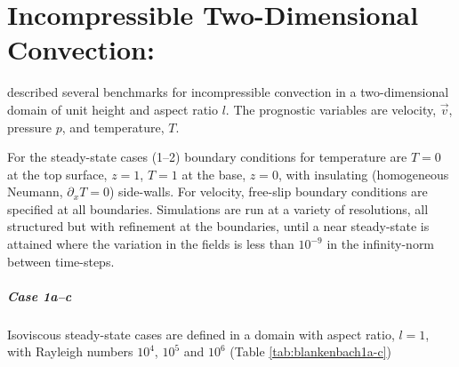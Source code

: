 %
%
%
%
%

\chapter{Incompressible Two-Dimensional Convection: \citeauthor{BlankenbachGJI1989}} \label{sec:blankenbach}

\citet{BlankenbachGJI1989} described several benchmarks for
incompressible convection in a two-dimensional domain of unit height
and aspect ratio $l$.  The prognostic variables are velocity, $\vec{v}$,
pressure $p$, and temperature, $T$.

For the steady-state cases (1--2) boundary conditions for temperature are $T=0$ at the top surface, $z=1$, $T=1$ at the base, $z=0$,
with insulating (homogeneous Neumann, $\partial_x T = 0$) side-walls.  For velocity, free-slip boundary conditions are specified at
all boundaries.  Simulations are run at a variety of resolutions, all structured but with refinement at the boundaries, until a near
steady-state is attained where the variation in the fields is less than $10^{-9}$ in the infinity-norm between time-steps.

\paragraph{Case 1a--c}
Isoviscous steady-state cases are defined in a domain with aspect ratio, $l=1$,
with Rayleigh numbers $10^4$, $10^{5}$
and $10^{6}$ (Table \ref{tab:blankenbach1a-c})

